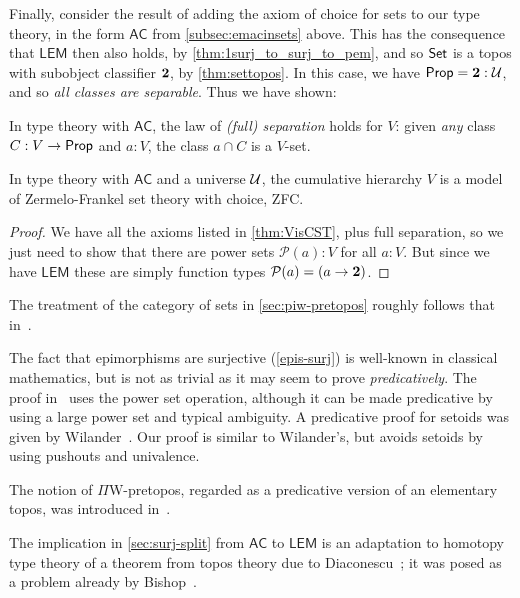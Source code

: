 Finally, consider the result of adding the axiom of choice for sets to our type theory, in the form  $\mathsf{AC}$ from \autoref{subsec:emacinsets} above.  This has the consequence that $\mathsf{LEM}$ then also holds, by \autoref{thm:1surj_to_surj_to_pem}, and so $\mathsf{Set}$ is a topos with subobject classifier $\mathbf{2}$, by \autoref{thm:settopos}.  In this case, we have $\mathsf{Prop} = \mathbf{2}:\mathcal{U}$, and so \emph{all classes are separable}.  Thus we have shown:

\begin{lem}\label{lem:fullsep}
In type theory with $\mathsf{AC}$, the law of \emph{(full) separation} holds for $V$: given \emph{any} class $C : V \to \mathsf{Prop}$ and $a : V$, the class $a \cap C$ is a $V$-set.
\end{lem}

\begin{thm}\label{thm:zfc}
In type theory with $\mathsf{AC}$ and a universe $\mathcal{U}$, the cumulative hierarchy $V$ is a model of Zermelo-Frankel set theory with choice, ZFC.
\end{thm}

\begin{proof}
We have all the axioms listed in \autoref{thm:VisCST}, plus full separation, so we just need to show that there are power sets $\mathcal{P}(a):V$ for all $a:V$.  But since we have $\mathsf{LEM}$ these are simply function types $\mathcal{P}(a) = (a\to\mathbf{2})$.
\end{proof}

\sectionNotes

The treatment of the category of sets in \autoref{sec:piw-pretopos} roughly follows that in~\cite{RijkeSpitters}.

The fact that epimorphisms are surjective (\autoref{epis-surj}) is well-known in classical mathematics, but is not as trivial as it may seem to prove \emph{predicatively}.
The proof in~\cite{Mines/R/R:1988} uses the power set operation, although it can be made predicative by using a large power set and typical ambiguity.
A predicative proof for setoids was given by Wilander~\cite{Wilander2010}. 
Our proof is similar to Wilander's, but avoids setoids by using pushouts and univalence.

The notion of $\Pi$W-pretopos, regarded as a predicative version of an elementary topos, was introduced in~\cite{MoerdijkPalmgren}.

The implication in \autoref{sec:surj-split} from $\mathsf{AC}$ to $\mathsf{LEM}$ is an adaptation to homotopy type theory of a theorem from topos theory due to Diaconescu~\cite{Diaconescu}; it was posed as a problem already by Bishop~\cite[Problem 2,p58]{Bishop1967}.

